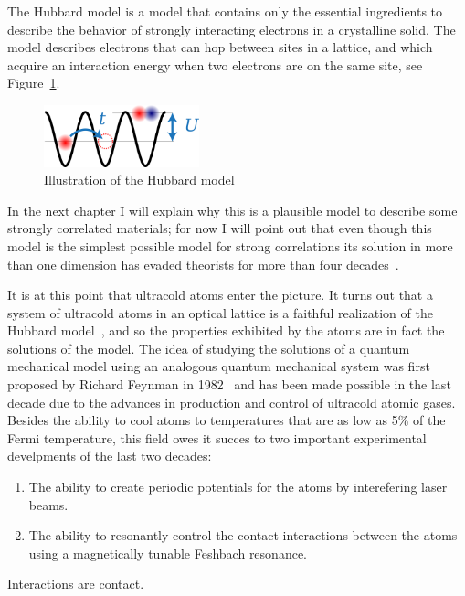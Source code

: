 \documentclass[oneside,11pt]{memoir}
\begin{document}
The Hubbard model is a model that contains only the essential ingredients
to describe the  behavior of strongly interacting electrons in a crystalline
solid.    The model describes electrons that can hop between sites in a
lattice, and which acquire an interaction energy when two electrons are on the
same site, see Figure~\ref{fig:chap01hubbard}.  
\begin{figure} \centering
\includegraphics[width=0.4\textwidth]{../figures/hubbard/little-hubbard.png}
\caption[Hubbard model]{\small Illustration of the Hubbard model }
\label{fig:chap01hubbard}
\end{figure}
In the next chapter I will explain why this is a plausible model to
describe some strongly correlated materials;  for now I will point out that
even though this model is the simplest possible model for strong correlations
its solution in more than one dimension has evaded theorists for more than four
decades~\cite{quintanilla2009strong}.

It is at this point that ultracold atoms enter the picture.   It turns out that
a system of ultracold atoms in an optical lattice is a faithful realization of
the Hubbard model~\cite{PhysRevLett.81.3108}, and so the properties exhibited
by the atoms are in fact the solutions of the model.   The idea of studying the
solutions of a quantum mechanical model using an analogous quantum mechanical
system was first proposed by Richard Feynman in
1982~\cite{feynman1982simulating} and has been made possible in the last decade
due to the advances in production and control of ultracold atomic gases.
Besides the ability to cool atoms to temperatures that are as low as 5\% of the
Fermi temperature,   this field owes it succes to two important experimental
develpments of the last two decades:
\begin{enumerate}
\item The ability to create periodic potentials for the atoms by interefering
laser beams.  \item The ability to resonantly control the contact interactions
between the atoms using a magnetically tunable Feshbach resonance.
\end{enumerate} 

Interactions are contact.   
\end{document}
